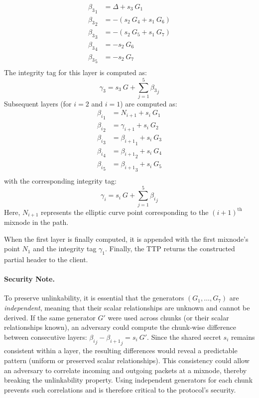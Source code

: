\[
\begin{aligned}
    {\beta_3}_1 &= \Delta       + s_3 \ G_1 \\
    {\beta_3}_2 &= - (s_2 \ G_4 + s_1 \ G_6) \\
    {\beta_3}_3 &= - (s_2 \ G_5 + s_1 \ G_7) \\
    {\beta_3}_4 &= - s_2 \ G_6 \\
    {\beta_3}_5 &= - s_2 \ G_7 \\
\end{aligned}
\]
The integrity tag for this layer is computed as:
\[
\gamma_3 = s_3 \ G + \sum_{j=1}^{5} {\beta_3}_j
\]
Subsequent layers (for $ i = 2 $ and $ i = 1 $) are computed as:
\[
\begin{aligned}
    {\beta_i}_1 &= N_{i+1} + s_i \ G_1\\
    {\beta_i}_2 &= \gamma_{i+1} + s_i \ G_2 \\
    {\beta_i}_3 &= {\beta_{i+1}}_1 + s_i \ G_3 \\
    {\beta_i}_4 &= {\beta_{i+1}}_2 + s_i \ G_4 \\
    {\beta_i}_5 &= {\beta_{i+1}}_3 + s_i \ G_5 \\
\end{aligned}
\]
with the corresponding integrity tag:
\[
\gamma_i = s_i \ G + \sum_{j=1}^{5} {\beta_i}_j
\]
Here, $ N_{i+1} $ represents the elliptic curve point corresponding to the $ (i+1)^\text{th} $ mixnode in the path.

When the first layer is finally computed, it is appended with the first mixnode’s point $ N_1 $ and the integrity tag $ \gamma_1 $.
Finally, the TTP returns the constructed partial header to the client.

\paragraph{\textbf{Security Note.}}\label{note:security_why_indep_generators}
To preserve unlinkability, it is essential that the generators $ (G_1, \dots, G_7) $ are \textit{independent}, meaning that their scalar relationships are unknown and cannot be derived.
If the same generator $ G' $ were used across chunks (or their scalar relationships known), an adversary could compute the chunk-wise difference between consecutive layers: $ {\beta_i}_j - {\beta_{i+1}}_j = s_i \ G' $.
Since the shared secret $ s_i $ remains consistent within a layer, the resulting differences would reveal a predictable pattern (uniform or preserved scalar relationships).
This consistency could allow an adversary to correlate incoming and outgoing packets at a mixnode, thereby breaking the unlinkability property.
Using independent generators for each chunk prevents such correlations and is therefore critical to the protocol's security.  
  

